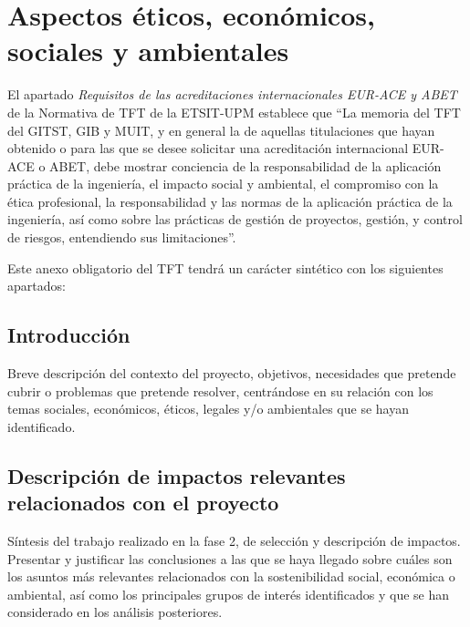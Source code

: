 %
%

\chapter{Aspectos éticos, económicos, sociales y ambientales}
\label{cha:aspectos-eticos}

El apartado \emph{Requisitos de las acreditaciones internacionales EUR-ACE y ABET} de la Normativa de TFT de la ETSIT-UPM establece que ``La memoria del TFT del GITST, GIB y MUIT, y en general la de aquellas titulaciones que hayan obtenido o para las que se desee solicitar una acreditación internacional EUR-ACE o ABET, debe mostrar conciencia de la responsabilidad de la aplicación práctica de la ingeniería, el impacto social y ambiental, el compromiso con la ética profesional, la responsabilidad y las normas de la aplicación práctica de la ingeniería, así como sobre las prácticas de gestión de proyectos, gestión, y control de riesgos, entendiendo sus limitaciones''.

Este anexo obligatorio del TFT tendrá un carácter sintético con los siguientes apartados:

\section{Introducción}
\label{sec:aspectos-eticos-introduccion}

Breve descripción del contexto del proyecto, objetivos, necesidades que pretende cubrir o problemas que pretende resolver, centrándose en su relación con los temas sociales, económicos, éticos, legales y/o ambientales que se hayan identificado.

\section{Descripción de impactos relevantes relacionados con el proyecto}
\label{sec:aspectos-eticos-impactos}

Síntesis del trabajo realizado en la fase 2, de selección y descripción de impactos. Presentar y justificar las conclusiones a las que se haya llegado sobre cuáles son los asuntos más relevantes relacionados con la sostenibilidad social, económica o ambiental, así como los principales grupos de interés identificados y que se han considerado en los análisis posteriores.

